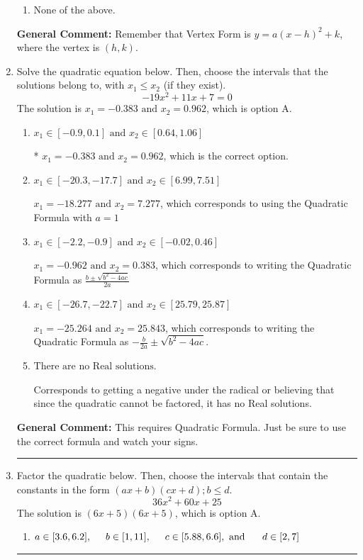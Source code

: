 \documentclass{extbook}[14pt]
\newcommand{\litem}[1]{\item #1

\rule{\textwidth}{0.4pt}}
\begin{document}
\begin{enumerate}
{\begin{enumerate}[label=\Alph*.]
\begin{multicols}{2}
\end{multicols}\item None of the above.\end{enumerate}
\textbf{General Comment:} Remember that Vertex Form is $y = a(x-h)^2+k$, where the vertex is $(h, k)$.
}
\litem{
Solve the quadratic equation below. Then, choose the intervals that the solutions belong to, with $x_1 \leq x_2$ (if they exist).
\[ -19x^{2} +11 x + 7 = 0 \]The solution is \( x_1 = -0.383 \text{ and } x_2 = 0.962 \), which is option A.\begin{enumerate}[label=\Alph*.]
\item \( x_1 \in [-0.9, 0.1] \text{ and } x_2 \in [0.64, 1.06] \)

* $x_1 = -0.383 \text{ and } x_2 = 0.962$, which is the correct option.
\item \( x_1 \in [-20.3, -17.7] \text{ and } x_2 \in [6.99, 7.51] \)

 $x_1 = -18.277 \text{ and } x_2 = 7.277$, which corresponds to using the Quadratic Formula with $a=1$
\item \( x_1 \in [-2.2, -0.9] \text{ and } x_2 \in [-0.02, 0.46] \)

 $x_1 = -0.962 \text{ and } x_2 = 0.383$, which corresponds to writing the Quadratic Formula as $\frac{b \pm \sqrt{b^2 - 4ac}}{2a}$
\item \( x_1 \in [-26.7, -22.7] \text{ and } x_2 \in [25.79, 25.87] \)

 $x_1 = -25.264 \text{ and } x_2 = 25.843$, which corresponds to writing the Quadratic Formula as $-\frac{b}{2a} \pm \sqrt{b^2 - 4ac}$.
\item \( \text{There are no Real solutions.} \)

Corresponds to getting a negative under the radical or believing that since the quadratic cannot be factored, it has no Real solutions.
\end{enumerate}

\textbf{General Comment:} This requires Quadratic Formula. Just be sure to use the correct formula and watch your signs.
}
\litem{
Factor the quadratic below. Then, choose the intervals that contain the constants in the form $(ax+b)(cx+d); b \leq d.$
\[ 36x^{2} +60 x + 25 \]The solution is \( (6x + 5)(6x + 5) \), which is option A.\begin{enumerate}[label=\Alph*.]
\item \( a \in [3.6, 6.2], \hspace*{5mm} b \in [1, 11], \hspace*{5mm} c \in [5.88, 6.6], \text{ and } \hspace*{5mm} d \in [2, 7] \)


\end{enumerate}}
\end{enumerate}
\end{document}
